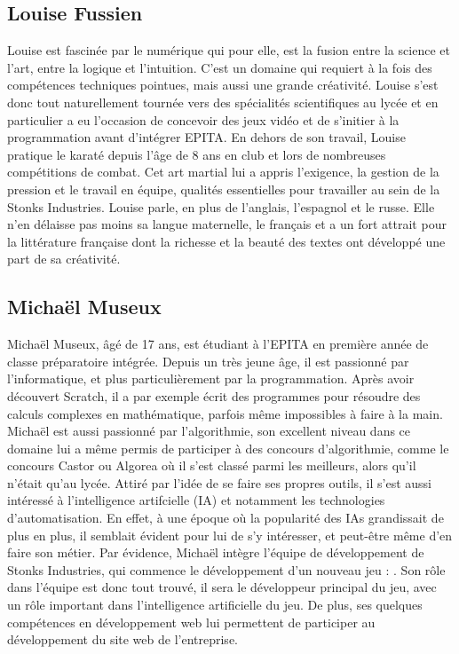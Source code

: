 \subsection*{Louise Fussien} 
Louise est fascinée par le numérique qui pour elle, est la fusion entre la science et l'art, entre la logique et l'intuition. 
C'est un domaine qui requiert à la fois des compétences techniques pointues, mais aussi une grande créativité.
 Louise s'est donc tout naturellement tournée vers des spécialités scientifiques au lycée et en particulier a eu l'occasion de concevoir des jeux vidéo et 
 de s'initier à la programmation avant d'intégrer EPITA. 
 En dehors de son travail, Louise pratique le karaté depuis l'âge de 8 ans en club et lors de nombreuses compétitions de combat. 
 Cet art martial lui a appris l'exigence, la gestion de la pression et le travail en équipe, qualités essentielles pour travailler au sein de la Stonks Industries. 
Louise parle, en plus de l'anglais, l'espagnol et le russe. Elle n'en délaisse pas moins sa langue maternelle, 
le français et a un fort attrait pour la littérature française dont la richesse et la beauté des textes ont développé une part de sa créativité.

\subsection*{Michaël Museux}
Michaël Museux, âgé de 17 ans, est étudiant à l'EPITA en première année de classe
préparatoire intégrée. Depuis un très jeune âge, il est passionné par l'informatique, et plus
particulièrement par la programmation. Après avoir découvert Scratch, il a par exemple
écrit des programmes pour résoudre des calculs complexes en mathématique, parfois même
impossibles à faire à la main. Michaël est aussi passionné par l'algorithmie, son excellent
niveau dans ce domaine lui a même permis de participer à des concours d'algorithmie, comme
le concours Castor ou Algorea où il s'est classé parmi les meilleurs, alors qu'il n'était qu'au
lycée. Attiré par l'idée de se faire ses propres outils, il s'est aussi intéressé à l'intelligence
artifcielle (IA) et notamment les technologies d'automatisation. En effet, à une époque où la
popularité des IAs grandissait de plus en plus, il semblait évident pour lui de s'y intéresser,
et peut-être même d'en faire son métier.
Par évidence, Michaël intègre l'équipe de développement de Stonks Industries, qui commence
le développement d'un nouveau jeu : \gameName. Son rôle dans l'équipe est donc tout
trouvé, il sera le développeur principal du jeu, avec un rôle important dans l'intelligence
artificielle du jeu. De plus, ses quelques compétences en développement web lui permettent
de participer au développement du site web de l'entreprise.
\\

